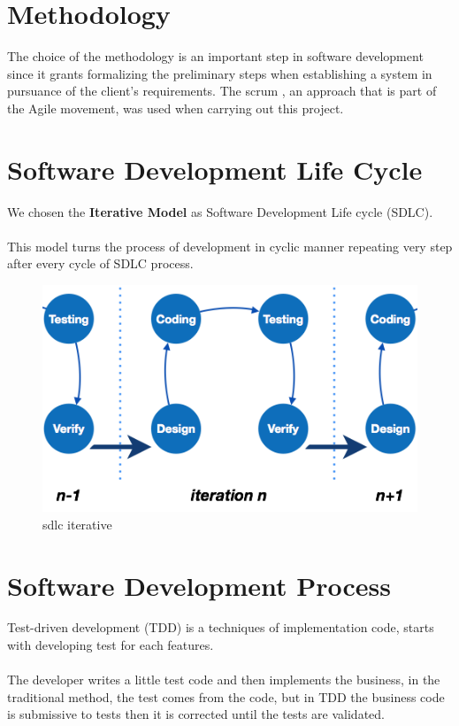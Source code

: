 	\section{Methodology}
	The choice of the methodology is an important step in software development since it grants formalizing the preliminary steps when establishing a system in pursuance of the client’s requirements.
	The scrum , an approach that is part of the Agile movement, was used when carrying out this project.
	
	\newpage
	
	\section{Software Development Life Cycle}
	We chosen the \textbf{Iterative Model }as Software Development Life cycle (SDLC).
	\\
	\\
	This model turns the process of development in cyclic manner repeating very step after every cycle of SDLC process. 
	
	\begin{figure}[h]
		\centering
		\includegraphics[width=1\textwidth]{sdlc_iterative.png}
		\caption{sdlc iterative}
	\end{figure}  

	\newpage

	\section{Software Development Process}
	Test-driven development (TDD) is a techniques of implementation code, starts with developing test for each features. 
	\\
	\\
	The developer writes a little test code and then implements the business, in the traditional method, the test comes from the code, but in TDD the business code is submissive to tests then it is corrected until the tests are validated. 
	
